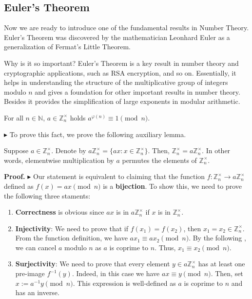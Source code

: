 \documentclass[../lecture-notes-148x210.tex]{subfiles}
\begin{document}
\subsection{Euler's Theorem}
Now we are ready to introduce one of the fundamental results in Number Theory.
Euler's Theorem was discovered by the mathematician Leonhard Euler 
as a generalization of Fermat's Little Theorem.

Why is it so important? Euler's Theorem is a key result in number theory and 
cryptographic applications, such as RSA encryption, and so on. 
Essentially, it helps in understanding the structure of the multiplicative group of 
integers modulo $n$ and gives a foundation for other important results in number theory. 
Besides it provides the simplification of large exponents in modular arithmetic. 

\begin{theorem} [Euler's] \label{th:euler_theorem}
    For all $n \in \mathbb{N}$, $a \in \mathbb{Z}_n^{\times}$ 
    holds $a^{\varphi(n)} \equiv 1 \pmod{n}$.
\end{theorem}

$\blacktriangleright$ To prove this fact, we prove the following auxiliary lemma.

\begin{lemma}
    Suppose $a \in \mathbb{Z}_n^{\times}$. Denote by $a\mathbb{Z}_n^{\times} =
    \{ax: x \in \mathbb{Z}_n^{\times}\}$. Then, $\mathbb{Z}_n^{\times} =
    a\mathbb{Z}_n^{\times}$. In other words, elementwise multiplication by $a$
    permutes the elements of $\mathbb{Z}_n^{\times}$.
\end{lemma}

\textbf{Proof.} $\blacktriangleright$ Our statement is equivalent to claiming that the 
function $f: \mathbb{Z}_n^{\times} \to a\mathbb{Z}_n^{\times}$ defined 
as $f(x) = ax \pmod{n}$ is a \textbf{bijection}. To show this, we need to prove the following 
three staments:
\begin{enumerate}
    \item \textbf{Correctness} is obvious since $ax$ is in $a\mathbb{Z}_n^{\times}$ if $x$ is in $\mathbb{Z}_n^{\times}$.
    \item \textbf{Injectivity}: We need to prove that if $f(x_1)=f(x_2)$, 
    then $x_1=x_2 \in \mathbb{Z}_n^{\times}$. 
    From the function definition, we have $ax_1 \equiv ax_2 \pmod{n}$. By the following 
    , we can cancel $a$ modulo $n$ as $a$ is coprime to $n$. 
    Thus, $x_1 \equiv x_2 \pmod{n}$.
    \item \textbf{Surjectivity}: We need to prove that every element $y \in a\mathbb{Z}_n^{\times}$ has at least 
    one pre-image $f^{-1}(y)$. Indeed, in this case we have $ax \equiv y \pmod{n}$. Then, set $x := a^{-1}y \pmod {n}$. This 
    expression is well-defined as $a$ is coprime to $n$ and has an inverse.
\end{enumerate}
\end{document}
